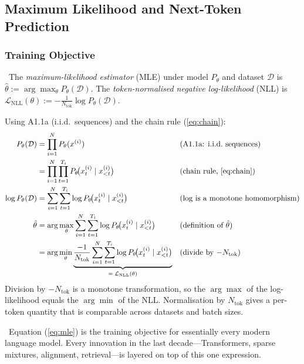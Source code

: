 \subsection{Maximum Likelihood and Next-Token Prediction}

\subsubsection{Training Objective}

\Def\ The \emph{maximum-likelihood estimator} (MLE) under model
$P_\theta$ and dataset $\mathcal{D}$ is
$\hat\theta := \arg\max_\theta P_\theta(\mathcal{D})$. The
\emph{token-normalised negative log-likelihood} (NLL) is
$\mathcal{L}_{\mathrm{NLL}}(\theta) := -\frac{1}{N_{\mathrm{tok}}}
\log P_\theta(\mathcal{D})$.

\begin{derivation}
Using A1.1a (i.i.d.\ sequences) and the chain rule (\ref{eq:chain}):
\begin{align}
P_\theta(\mathcal{D})
  &= \prod_{i=1}^{N} P_\theta(x^{(i)})
  && \text{(A1.1a: i.i.d.\ sequences)} \label{eq:mle-1} \\
  &= \prod_{i=1}^{N} \prod_{t=1}^{T_i}
       P_\theta\!\big(x^{(i)}_t \mid x^{(i)}_{<t}\big)
  && \text{(chain rule, \ref{eq:chain})} \label{eq:mle-2} \\
  \log P_\theta(\mathcal{D})
  &= \sum_{i=1}^{N} \sum_{t=1}^{T_i}
       \log P_\theta\!\big(x^{(i)}_t \mid x^{(i)}_{<t}\big)
  && \text{($\log$ is a monotone homomorphism)} \label{eq:mle-3} \\
  \hat\theta
  &= \arg\max_\theta
       \sum_{i=1}^{N} \sum_{t=1}^{T_i}
       \log P_\theta\!\big(x^{(i)}_t \mid x^{(i)}_{<t}\big)
  && \text{(definition of $\hat\theta$)} \label{eq:mle-4} \\
  &= \arg\min_\theta
       \underbrace{\frac{-1}{N_{\mathrm{tok}}}
       \sum_{i=1}^{N} \sum_{t=1}^{T_i}
       \log P_\theta\!\big(x^{(i)}_t \mid x^{(i)}_{<t}\big)}_{=\;\mathcal{L}_{\mathrm{NLL}}(\theta)}
  && \text{(divide by $-N_{\mathrm{tok}}$)} \label{eq:mle}
\end{align}
Division by $-N_{\mathrm{tok}}$ is a monotone transformation, so the
$\arg\max$ of the log-likelihood equals the $\arg\min$ of the NLL.
Normalisation by $N_{\mathrm{tok}}$ gives a per-token quantity that is
comparable across datasets and batch sizes.
\end{derivation}

\Cons\ Equation (\ref{eq:mle}) is the training objective for
essentially every modern language model. Every innovation in the last
decade---Transformers, sparse mixtures, alignment, retrieval---is
layered on top of this one expression.

